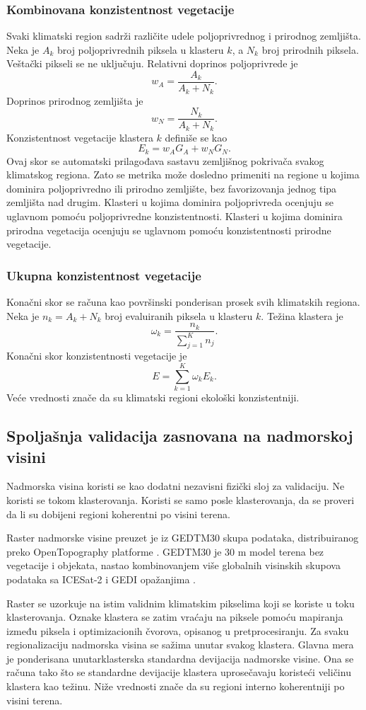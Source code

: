 \documentclass[11pt]{article}
\begin{document}
\subsubsection{Kombinovana konzistentnost vegetacije}
Svaki klimatski region sadrži različite udele poljoprivrednog i prirodnog zemljišta. Neka je $A_k$ broj poljoprivrednih piksela u klasteru $k$, a $N_k$ broj prirodnih piksela. Veštački pikseli se ne uključuju. Relativni doprinos poljoprivrede je
\[
w_A
=
\frac{A_k}{A_k+N_k}.
\]
Doprinos prirodnog zemljišta je
\[
w_N
=
\frac{N_k}{A_k+N_k}.
\]
Konzistentnost vegetacije klastera $k$ definiše se kao
\[
E_k
=
w_A G_A
+
w_N G_N.
\]
Ovaj skor se automatski prilagođava sastavu zemljišnog pokrivača svakog klimatskog regiona. Zato se metrika može dosledno primeniti na regione u kojima dominira poljoprivredno ili prirodno zemljište, bez favorizovanja jednog tipa zemljišta nad drugim. Klasteri u kojima dominira poljoprivreda ocenjuju se uglavnom pomoću poljoprivredne konzistentnosti. Klasteri u kojima dominira prirodna vegetacija ocenjuju se uglavnom pomoću konzistentnosti prirodne vegetacije.

\subsubsection{Ukupna konzistentnost vegetacije}
Konačni skor se računa kao površinski ponderisan prosek svih klimatskih regiona. Neka je $n_k=A_k+N_k$ broj evaluiranih piksela u klasteru $k$. Težina klastera je
\[
\omega_k
=
\frac{n_k}
{\sum_{j=1}^{K} n_j}.
\]
Konačni skor konzistentnosti vegetacije je
\[
E
=
\sum_{k=1}^{K}
\omega_k E_k.
\]
Veće vrednosti znače da su klimatski regioni ekološki konzistentniji.

\subsection{Spoljašnja validacija zasnovana na nadmorskoj visini}
Nadmorska visina koristi se kao dodatni nezavisni fizički sloj za validaciju. Ne koristi se tokom klasterovanja. Koristi se samo posle klasterovanja, da se proveri da li su dobijeni regioni koherentni po visini terena.

Raster nadmorske visine preuzet je iz GEDTM30 skupa podataka, distribuiranog preko OpenTopography platforme \cite{ho2025gedtm30data}. GEDTM30 je 30 m model terena bez vegetacije i objekata, nastao kombinovanjem više globalnih visinskih skupova podataka sa ICESat-2 i GEDI opažanjima \cite{ho2025gedtm30}.

Raster se uzorkuje na istim validnim klimatskim pikselima koji se koriste u toku klasterovanja. Oznake klastera se zatim vraćaju na piksele pomoću mapiranja između piksela i optimizacionih čvorova, opisanog u pretprocesiranju. Za svaku regionalizaciju nadmorska visina se sažima unutar svakog klastera. Glavna mera je ponderisana unutarklasterska standardna devijacija nadmorske visine. Ona se računa tako što se standardne devijacije klastera uprosečavaju koristeći veličinu klastera kao težinu. Niže vrednosti znače da su regioni interno koherentniji po visini terena.
\end{document}
